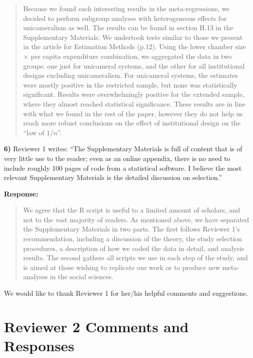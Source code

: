\documentclass[a4paper,12pt]{article}
\begin{document}
\begin{quote}
    Because we found such interesting results in the meta-regressions, we decided to perform subgroup analyses with heterogeneous effects for unicameralism as well. The results can be found in section H.13 in the Supplementary Materials. We undertook tests similar to those we present in the article for Estimation Methods (p.12). Using the lower chamber size $\times$ per capita expenditure combination, we aggregated the data in two groups: one just for unicameral systems, and the other for all institutional designs excluding unicameralism. For unicameral systems, the estimates were mostly positive in the restricted sample, but none was statistically significant. Results were overwhelmingly positive for the extended sample, where they almost reached statistical significance. These results are in line with what we found in the rest of the paper, however they do not help us reach more robust conclusions on the effect of institutional design on the ``law of $1/n$''.
\end{quote}

\vspace{.3cm}

\noindent \textbf{6)} Reviewer 1 writes: ``The Supplementary Materials is full of content that is of very little use to the reader; even as an online appendix, there is no need to include roughly 100 pages of code from a statistical software. I believe the most relevant Supplementary Materials is the detailed discussion on selection.''

\vspace{.3cm}

\noindent \textbf{Response:} 
\begin{quote}
    We agree that the R script is useful to a limited amount of scholars, and not to the vast majority of readers. As mentioned above, we have separated the Supplementary Materials in two parts. The first follows Reviewer 1's recommendation, including a discussion of the theory, the study selection procedures, a description of how we coded the data in detail, and analysis results. The second gathers all scripts we use in each step of the study, and is aimed at those wishing to replicate our work or to produce new meta-analyses in the social sciences.
\end{quote}

\vspace{.3cm}

We would like to thank Reviewer 1 for her/his helpful comments and suggestions.

\section*{Reviewer 2 Comments and Responses}
\end{document}
